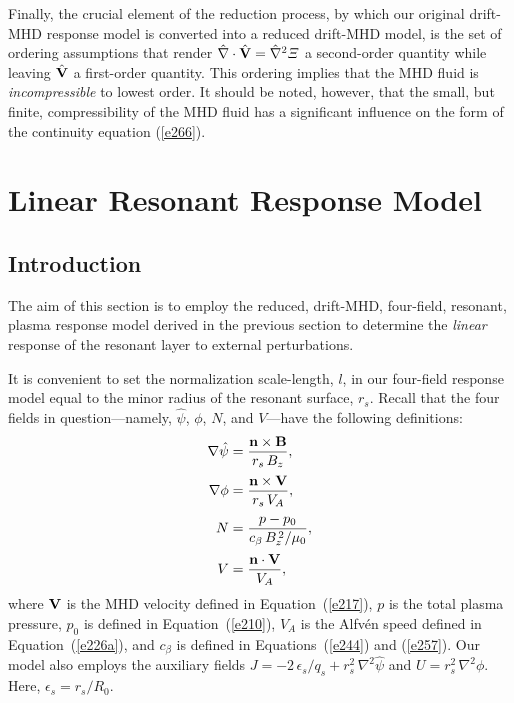 \documentclass[notitlepage,12pt]{article}
\begin{document}
Finally, the crucial element of the reduction process, by which our original drift-MHD response model is converted into a
reduced drift-MHD model, is the set of ordering assumptions that render $\hat{\nabla}\cdot \hat{\bf V}=\hat{\nabla}^2{\mit\Xi}$
a second-order quantity while leaving $\hat{\bf V}$ a first-order quantity. This ordering implies that the  MHD fluid is
{\em incompressible}\/ to lowest order. It should be noted, however, that the small, but finite, compressibility of the
MHD fluid has a significant influence on the form of the continuity equation (\ref{e266}).

\section{Linear Resonant  Response Model}\label{linear}
\subsection{Introduction}
The aim of this section is to employ the reduced, drift-MHD, four-field, resonant, plasma response model derived in the
previous section to determine the {\em linear}\/ response of the resonant layer to external perturbations.

It is convenient to set the normalization scale-length, $l$, in our four-field response model equal to the minor radius of the resonant surface, $r_s$. 
Recall that the four fields in question---namely, $\hat{\psi}$, $\phi$, $N$, and $V$---have the following
definitions:
\begin{align}\label{e279}
\nabla\hat{\psi} &= \frac{{\bf n}\times{\bf B}} {r_s\,B_z},\\[0.5ex]
\nabla\phi &= \frac{{\bf n}\times {\bf V}}{r_s\,V_A},\\[0.5ex]
N &= \frac{p-p_0}{c_\beta\,B_z^{\,2}/\mu_0},\\[0.5ex]
V &= \frac{{\bf n}\cdot {\bf V}}{V_A},
\end{align}
where  ${\bf V}$ is the MHD velocity defined in Equation~(\ref{e217}),  $p$ is the total plasma pressure, $p_0$ is defined in Equation~(\ref{e210}), $V_A$ is the
Alfv\'{e}n speed defined in Equation~(\ref{e226a}), and $c_\beta$ is defined in Equations~(\ref{e244}) and (\ref{e257}). Our
model also employs the auxiliary fields $J=-2\,\epsilon_s/q_s+r_s^2\,\nabla^2 \hat{\psi}$ and  $U=r_s^2\,\nabla^2 \phi$. Here, $\epsilon_s=r_s/R_0$. 
\end{document}
